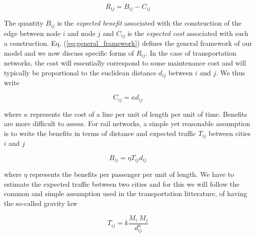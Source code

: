 \begin{equation}
    R_{ij} = B_{ij} - C_{ij}
    \label{eq:general_framework}
\end{equation}

The quantity $B_{ij}$ is the \textit{expected benefit} associated with the
construction of the edge between node $i$ and node $j$ and $C_{ij}$ is the
\textit{expected cost} associated with such a construction. Eq.
(\ref{eq:general_framework}) defines the general framework of our model and we
now discuss specific forms of $R_{ij}$. In the case of transportation networks,
the cost will essentially correspond to some maintenance cost and will typically
be proportional to the euclidean distance $d_{ij}$ between $i$ and $j$. We thus
write

\begin{equation}
    C_{ij} = \kappa d_{ij}
    \label{eq:cost}
\end{equation}

where $\kappa$ represents the cost of a line per unit of length per unit of
time. Benefits are more difficult to assess. For rail networks, a simple yet
reasonable assumption is to write the benefits in terms of distance and expected
traffic $T_{ij}$ between cities $i$ and $j$ 

\begin{equation} 
    B_{ij} = \eta T_{ij} d_{ij}
    \label{eq:benefits} 
\end{equation}

where $\eta$ represents the benefits per passenger per unit of length. We have
to estimate the expected traffic between two cities and for this we will follow
the common and simple assumption used in the transportation litterature, of
having the so-called gravity law ~\cite{Stewart:1948,Erlander:1990}

\begin{equation} 
    T_{ij} = k\frac{M_i \: M_j}{d_{ij}^a} 
    \label{eq:gravity} 
\end{equation}

